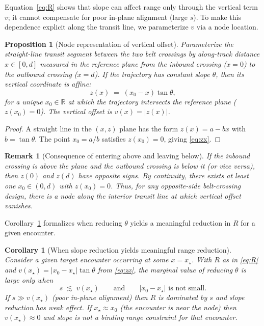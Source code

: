 \documentclass{article}
\newtheorem{proposition}{Proposition}
\newtheorem{corollary}{Corollary}
\newtheorem{remark}{Remark}
\begin{document}
Equation~\eqref{eq:R} shows that slope can affect range only through the vertical term $v$; it cannot compensate for poor in-plane alignment (large $s$). To make this dependence explicit along the transit line, we parameterize $v$ via a node location.

\begin{proposition}[Node representation of vertical offset]
\label{prop:node}
Parameterize the straight-line transit segment between the two belt crossings by along-track distance $x\in[0,d]$ measured in the reference plane from the inbound crossing ($x=0$) to the outbound crossing ($x=d$). If the trajectory has constant slope $\theta$, then its vertical coordinate is affine:
\begin{equation}
z(x) \;=\; (x_0-x)\tan\theta,
\label{eq:zx}
\end{equation}
for a unique $x_0\in\mathbb{R}$ at which the trajectory intersects the reference plane ($z(x_0)=0$). The vertical offset is $v(x)=|z(x)|$.
\end{proposition}

\begin{proof}
A straight line in the $(x,z)$ plane has the form $z(x)=a-bx$ with $b=\tan\theta$. The point $x_0=a/b$ satisfies $z(x_0)=0$, giving \eqref{eq:zx}.
\end{proof}

\begin{remark}[Consequence of entering above and leaving below]
If the inbound crossing is above the plane and the outbound crossing is below it (or vice versa), then $z(0)$ and $z(d)$ have opposite signs. By continuity, there exists at least one $x_0\in(0,d)$ with $z(x_0)=0$. Thus, for any opposite-side belt-crossing design, there is a node along the interior transit line at which vertical offset vanishes.
\end{remark}

Corollary~\ref{cor:meaningful} formalizes when reducing $\theta$ yields a meaningful reduction in $R$ for a given encounter.

\begin{corollary}[When slope reduction yields meaningful range reduction]
\label{cor:meaningful}
Consider a given target encounter occurring at some $x=x_\star$. With $R$ as in \eqref{eq:R} and $v(x_\star)=|x_0-x_\star|\tan\theta$ from \eqref{eq:zx}, the marginal value of reducing $\theta$ is large only when
\[
s \;\lesssim\; v(x_\star)
\qquad\text{and}\qquad
|x_0-x_\star| \text{ is not small.}
\]
If $s\gg v(x_\star)$ (poor in-plane alignment) then $R$ is dominated by $s$ and slope reduction has weak effect. If $x_\star\approx x_0$ (the encounter is near the node) then $v(x_\star)\approx 0$ and slope is not a binding range constraint for that encounter.
\end{corollary}
\end{document}
